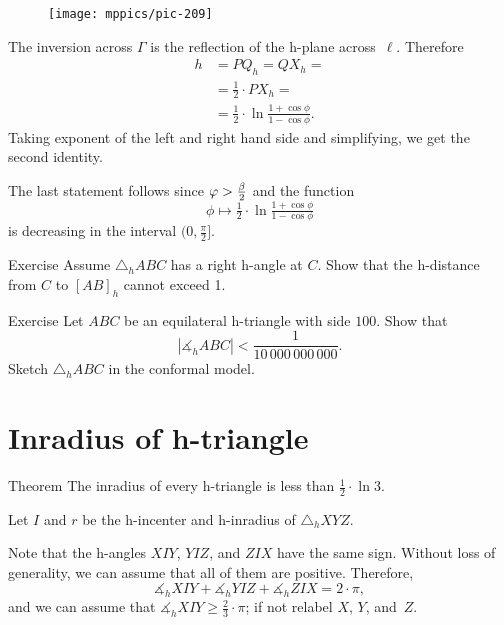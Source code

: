 {

\begin{wrapfigure}{o}{36mm}
\vskip-0mm
\centering
\texttt{[image: mppics/pic-209]}
\end{wrapfigure}

The inversion across $\Gamma$ is the reflection of the h-plane across~$\ell$. 
Therefore
\begin{align*}
h&=PQ_h=QX_h=
\\
&=\tfrac12\cdot PX_h=
\\
&=\tfrac12\cdot\ln \tfrac{1+\cos\phi}{1-\cos\phi}.
\end{align*}
Taking exponent of the left and right hand side and simplifying, we get the second identity.

}

The last statement follows since $\varphi>\tfrac\beta2$ and the function 
\[\phi\mapsto  \tfrac12\cdot\ln \tfrac{1+\cos\phi}{1-\cos\phi}\] 
is decreasing in the interval $(0,\tfrac\pi2]$.
\qeds

\begin{thm}{Exercise}\label{ex:right-angle-parallelism} 
Assume $\triangle_hABC$ has a right h-angle at $C$.
Show that the h-distance from $C$ to $[AB]_h$ cannot exceed 1.
\end{thm}

\begin{thm}{Exercise}\label{ex:small-angle}
Let $ABC$ be an equilateral h-triangle with side $100$.
Show that 
\[|\measuredangle_h ABC|<\frac1{10\,000\,000\,000}.\]
Sketch $\triangle_h ABC$ in the conformal model.
\end{thm}


\section{Inradius of h-triangle}

\begin{thm}{Theorem}\label{thm:h-inradius}
The inradius of every h-triangle
is less than $\tfrac12\cdot\ln3$.
\end{thm}

Let $I$ and $r$ be the h-incenter and h-inradius of $\triangle_hXYZ$.

Note that the h-angles 
$XIY$, 
$YIZ$, and 
$ZIX$
have the same sign.
Without loss of generality, we can assume that all of them are positive.
Therefore,
\[\measuredangle_hXIY+ 
\measuredangle_hYIZ+ 
\measuredangle_hZIX=2\cdot\pi,
\]
and we can assume that
$\measuredangle_hXIY\ge\tfrac23\cdot\pi$;
if not relabel $X$, $Y$, and~$Z$.

